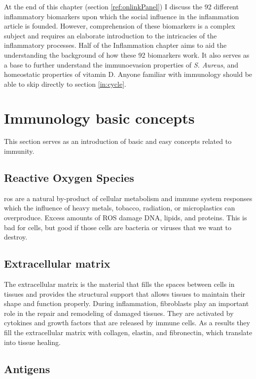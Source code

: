 At the end of this chapter (section \ref{ref:onlinkPanel}) I discuss the 92 different inflammatory biomarkers upon which the social influence in the inflammation article is founded. However, comprehension of these biomarkers is a complex subject and requires an elaborate introduction to the intricacies of the inflammatory processes. Half of the Inflammation chapter aims to aid the understanding the background of how these 92 biomarkers work. It also serves as a base to further understand the immunoevasion properties of \textit{S. Aureus}, and homeostatic properties of vitamin D. Anyone familiar with immunology should be able to skip directly to section \ref{in:cycle}.

\section{Immunology basic concepts}

This section serves as an introduction of basic and easy concepts related to immunity.

\subsection{Reactive Oxygen Species}

\gls{ros} are a natural by-product of cellular metabolism and immune system responses which the influence of heavy metals, tobacco, radiation, or microplastics can overproduce. Excess amounts of ROS damage DNA, lipids, and proteins. This is bad for cells, but good if those cells are bacteria or viruses that we want to destroy.

\subsection{Extracellular matrix}

The extracellular matrix is the material that fills the spaces between cells in tissues and provides the structural support that allows tissues to maintain their shape and function properly. During inflammation, fibroblasts play an important role in the repair and remodeling of damaged tissues. They are activated by cytokines and growth factors that are released by immune cells. As a results they fill the extracellular matrix with collagen, elastin, and fibronectin, which translate into tissue healing.

\subsection{Antigens}

